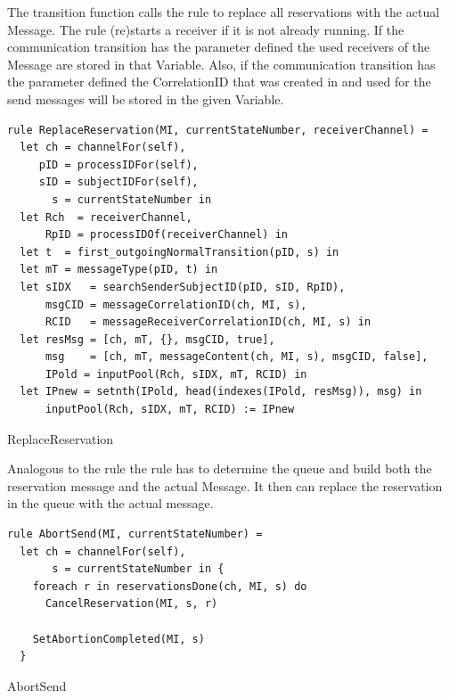 The transition function calls the  rule to replace all
reservations with the actual Message. The  rule
(re)starts a receiver if it is not already running.
If the communication transition has the parameter  defined
the used receivers of the Message are stored in that Variable.
Also, if the communication transition has the parameter  defined
the CorrelationID that was created in  and used for the send messages will be stored in the given Variable.


\begin{listing}[htbp]
\begin{verbatim}
rule ReplaceReservation(MI, currentStateNumber, receiverChannel) =
  let ch = channelFor(self),
     pID = processIDFor(self),
     sID = subjectIDFor(self),
       s = currentStateNumber in
  let Rch  = receiverChannel,
      RpID = processIDOf(receiverChannel) in
  let t  = first_outgoingNormalTransition(pID, s) in
  let mT = messageType(pID, t) in
  let sIDX   = searchSenderSubjectID(pID, sID, RpID),
      msgCID = messageCorrelationID(ch, MI, s),
      RCID   = messageReceiverCorrelationID(ch, MI, s) in
  let resMsg = [ch, mT, {}, msgCID, true],
      msg    = [ch, mT, messageContent(ch, MI, s), msgCID, false],
      IPold = inputPool(Rch, sIDX, mT, RCID) in
  let IPnew = setnth(IPold, head(indexes(IPold, resMsg)), msg) in
      inputPool(Rch, sIDX, mT, RCID) := IPnew
\end{verbatim}
\caption{ReplaceReservation}
\label{lst:shortasm:ReplaceReservation}
\end{listing}


Analogous to the  rule the
 rule has to determine the queue and build both
the reservation message and the actual Message. It then can replace the reservation
in the queue with the actual message.


\begin{listing}[htbp]
\begin{verbatim}
rule AbortSend(MI, currentStateNumber) =
  let ch = channelFor(self),
       s = currentStateNumber in {
    foreach r in reservationsDone(ch, MI, s) do
      CancelReservation(MI, s, r)

    SetAbortionCompleted(MI, s)
  }
\end{verbatim}
\caption{AbortSend}
\label{lst:shortasm:AbortSend}
\end{listing}


